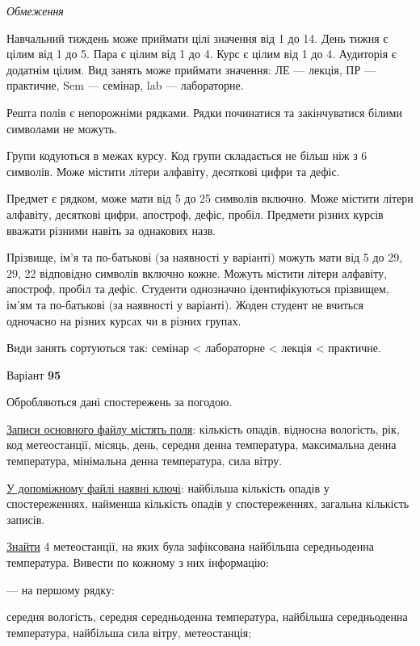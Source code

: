 \documentclass[11pt, ukrainian]{article}
\begin{document}

\bigskip\textit{Обмеження}

Навчальний тиждень може приймати цілі значення від 1 до 14.
День тижня є цілим від 1 до 5. Пара є цілим від 1 до 4.
Курс є цілим від 1 до 4. Аудиторія є додатнім цілим.
Вид занять може приймати значення:
ЛЕ --- лекція, ПР --- практичне, Sem --- семінар, lab --- лабораторне.

Решта полів є непорожніми рядками.
Рядки починатися та закінчуватися білими символами не можуть.

Групи кодуються в межах курсу.
Код групи складається не більш ніж з 6 символів.
Може містити літери алфавіту, десяткові цифри та дефіс.

Предмет є рядком, може мати від 5 до 25 символів включно.
Може містити літери алфавіту, десяткові цифри, апостроф, дефіс, пробіл.
Предмети різних курсів вважати різними навіть за однакових назв.

Прізвище, ім’я та по-батькові (за наявності у варіанті)
можуть мати від 5 до 29, 29, 22 відповідно символів включно кожне.
Можуть містити літери алфавіту, апостроф, пробіл та дефіс.
Студенти однозначно ідентифікуються прізвищем, ім’ям та по-батькові (за наявності у варіанті).
Жоден студент не вчиться одночасно на різних курсах чи в різних групах.

Види занять сортуються так: семінар < лабораторне < лекція < практичне.





\par
\newpage
{\center Варіант  \No \textbf { 95 }\par}
\bigskip
Обробляються дані спостережень за погодою. 

\underline{Записи основного файлу містять поля}: кількість опадів, відносна вологість, рік, код метеостанції, місяць, день, середня денна температура, максимальна денна температура, мінімальна денна температура, сила вітру.

\underline{У допоміжному файлі наявні ключі}: найбільша кількість опадів у спостереженнях, найменша кількість опадів у спостереженнях, загальна кількість записів.

\underline{Знайти} 4 метеостанції, на яких була зафіксована найбільша середньоденна температура. Вивести по кожному з них інформацію:\par
{\noindent}--- на першому рядку:\par
середня вологість, середня середньоденна температура, найбільша середньоденна температура, найбільша сила вітру, метеостанція;
\end{document}
